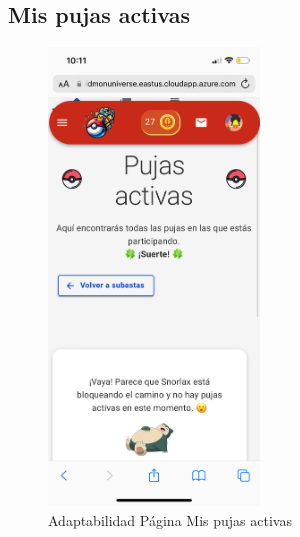 \subsection*{Mis pujas activas}
\begin{figure}[H]
    \centering
    \includegraphics[width=0.5\textwidth]{figures/adaptabilidad/pujas.png}
    \caption{Adaptabilidad Página Mis pujas activas}
    \label{fig:Adap-Mis-Pujas}
\end{figure}

